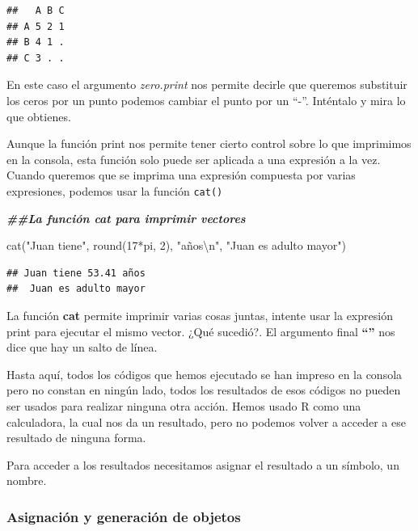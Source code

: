 \documentclass[
]{article}
\newenvironment{Shaded}{\begin{snugshade}}{\end{snugshade}}
\newcommand{\DecValTok}[1]{\textcolor[rgb]{0.00,0.00,0.81}{#1}}
\newcommand{\DocumentationTok}[1]{\textcolor[rgb]{0.56,0.35,0.01}{\textbf{\textit{#1}}}}
\newcommand{\FunctionTok}[1]{\textcolor[rgb]{0.00,0.00,0.00}{#1}}
\newcommand{\NormalTok}[1]{#1}
\newcommand{\SpecialCharTok}[1]{\textcolor[rgb]{0.00,0.00,0.00}{#1}}
\newcommand{\StringTok}[1]{\textcolor[rgb]{0.31,0.60,0.02}{#1}}
\begin{document}
\begin{verbatim}
##   A B C
## A 5 2 1
## B 4 1 .
## C 3 . .
\end{verbatim}

En este caso el argumento \emph{zero.print} nos permite decirle que
queremos substituir los ceros por un punto podemos cambiar el punto por
un ``-''. Inténtalo y mira lo que obtienes.

Aunque la función print nos permite tener cierto control sobre lo que
imprimimos en la consola, esta función solo puede ser aplicada a una
expresión a la vez. Cuando queremos que se imprima una expresión
compuesta por varias expresiones, podemos usar la función \texttt{cat()}

\begin{Shaded}
\begin{Highlighting}[]
\DocumentationTok{\#\#La función cat para imprimir vectores}

\FunctionTok{cat}\NormalTok{(}\StringTok{"Juan tiene"}\NormalTok{, }\FunctionTok{round}\NormalTok{(}\DecValTok{17}\SpecialCharTok{*}\NormalTok{pi, }\DecValTok{2}\NormalTok{), }\StringTok{"años}\SpecialCharTok{\textbackslash{}n}\StringTok{"}\NormalTok{, }
    \StringTok{"Juan es adulto mayor"}\NormalTok{)}
\end{Highlighting}
\end{Shaded}

\begin{verbatim}
## Juan tiene 53.41 años
##  Juan es adulto mayor
\end{verbatim}

La función \textbf{cat} permite imprimir varias cosas juntas, intente
usar la expresión print para ejecutar el mismo vector. ¿Qué sucedió?. El
argumento final \textbf{``\n''} nos dice que hay un salto de línea.

Hasta aquí, todos los códigos que hemos ejecutado se han impreso en la
consola pero no constan en ningún lado, todos los resultados de esos
códigos no pueden ser usados para realizar ninguna otra acción. Hemos
usado R como una calculadora, la cual nos da un resultado, pero no
podemos volver a acceder a ese resultado de ninguna forma.

Para acceder a los resultados necesitamos asignar el resultado a un
símbolo, un nombre.

\hypertarget{asignaciuxf3n-y-generaciuxf3n-de-objetos}{%
\subsubsection{Asignación y generación de
objetos}\label{asignaciuxf3n-y-generaciuxf3n-de-objetos}}
\end{document}
